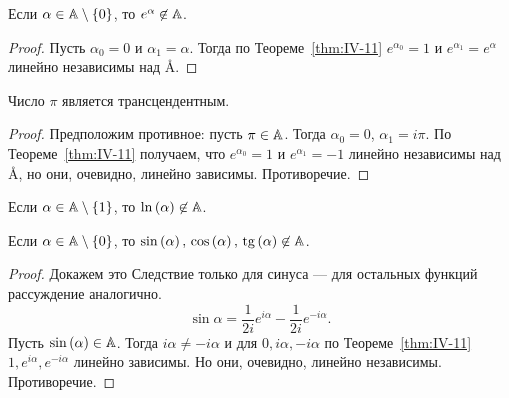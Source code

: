 \begin{ncorollary}
\label{crl:IV-2}
    Если $\alpha \in \AA \setminus \{ 0 \}$, то $e^\alpha \not\in \AA$.
\end{ncorollary}
\begin{proof}
    Пусть $\alpha_0 = 0$ и $\alpha_1 = \alpha$. Тогда по Теореме~\ref{thm:IV-11} $e^{\alpha_0} = 1$ и $e^{\alpha_1} = e^\alpha$ линейно независимы над \AA.
\end{proof}

\begin{ncorollary}
\label{crl:IV-3}
    Число $\pi$ является трансцендентным.
\end{ncorollary}
\begin{proof}
    Предположим противное: пусть $\pi \in \AA$. Тогда $\alpha_0 = 0$, $\alpha_1 = i\pi$. По Теореме~\ref{thm:IV-11} получаем, что $e^{\alpha_0} = 1$ и $e^{\alpha_1} = -1$ линейно независимы над \AA, но они, очевидно, линейно зависимы. Противоречие.
\end{proof}

\begin{ncorollary}
\label{crl:IV-4}
    Если $\alpha \in \AA \setminus \{ 1 \}$, то $\ln{\alpha} \not\in \AA$.
\end{ncorollary}

\begin{ncorollary}
\label{crl:IV-5}
    Если $\alpha \in \AA \setminus \{ 0 \}$, то $\sin{\alpha},\, \cos{\alpha},\, \tan{\alpha} \not\in \AA$.
\end{ncorollary}
\begin{proof}
    Докажем это Следствие только для синуса --- для остальных функций рассуждение аналогично.
    \[
        \sin{\alpha} = \frac{1}{2i}e^{i\alpha} - \frac{1}{2i}e^{-i\alpha}.
    \]
    Пусть $\sin{\alpha} \in \AA$. Тогда $i\alpha \ne -i\alpha$ и для $0, i\alpha, -i\alpha$ по Теореме~\ref{thm:IV-11} $1, e^{i\alpha}, e^{-i\alpha}$ линейно зависимы. Но они, очевидно, линейно независимы. Противоречие.
\end{proof}

